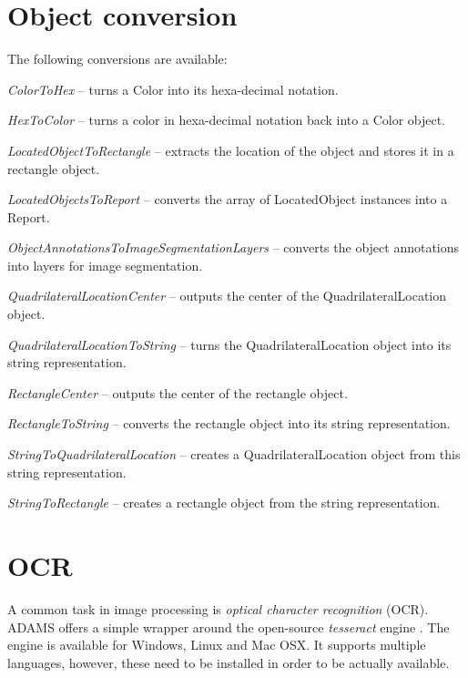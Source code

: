 \documentclass[a4paper]{book}
\begin{document}
\chapter{Object conversion}
The following conversions are available:
\begin{tight_itemize}
  \item \textit{ColorToHex} -- turns a Color into its hexa-decimal
  notation.
  \item \textit{HexToColor} -- turns a color in hexa-decimal notation back
  into a Color object.
  \item \textit{LocatedObjectToRectangle} -- extracts the location of the
  object and stores it in a rectangle object.
  \item \textit{LocatedObjectsToReport} -- converts the array of LocatedObject
  instances into a Report.
  \item \textit{ObjectAnnotationsToImageSegmentationLayers} -- converts the
  object annotations into layers for image segmentation.
  \item \textit{QuadrilateralLocationCenter} -- outputs the center of the
  QuadrilateralLocation object.
  \item \textit{QuadrilateralLocationToString} -- turns the
  QuadrilateralLocation object into its string representation.
  \item \textit{RectangleCenter} -- outputs the center of the rectangle object.
  \item \textit{RectangleToString} -- converts the rectangle object into its
  string representation.
  \item \textit{StringToQuadrilateralLocation} -- creates a QuadrilateralLocation
  object from this string representation.
  \item \textit{StringToRectangle} -- creates a rectangle object from the string
  representation.
\end{tight_itemize}


\chapter{OCR}
A common task in image processing is \textit{optical character recognition} 
(OCR). ADAMS offers a simple wrapper around the open-source \textit{tesseract} 
engine \cite{tesseract}. The engine is available for Windows, Linux and Mac OSX.
It supports multiple languages, however, these need to be installed in order to
be actually available.
\end{document}
